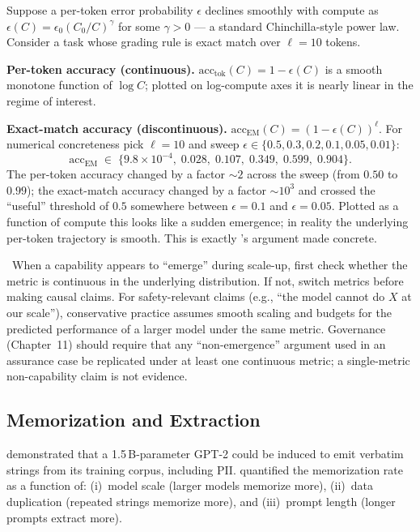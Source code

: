 \begin{workedexample}
Suppose a per-token error probability $\epsilon$ declines smoothly
with compute as $\epsilon(C) = \epsilon_0 (C_0/C)^{\gamma}$ for some
$\gamma > 0$ — a standard Chinchilla-style power law. Consider a
task whose grading rule is exact match over $\ell = 10$ tokens.

\textbf{Per-token accuracy (continuous).}
$\mathrm{acc}_{\mathrm{tok}}(C) = 1 - \epsilon(C)$ is a smooth
monotone function of $\log C$; plotted on log-compute axes it is
nearly linear in the regime of interest.

\textbf{Exact-match accuracy (discontinuous).}
$\mathrm{acc}_{\mathrm{EM}}(C) = (1 - \epsilon(C))^{\ell}$. For
numerical concreteness pick $\ell = 10$ and sweep
$\epsilon \in \{0.5, 0.3, 0.2, 0.1, 0.05, 0.01\}$:
\[
\mathrm{acc}_{\mathrm{EM}} \;\in\;
\{9.8\!\times\!10^{-4},\; 0.028,\; 0.107,\; 0.349,\; 0.599,\; 0.904\}.
\]
The per-token accuracy changed by a factor $\sim 2$ across the sweep
(from $0.50$ to $0.99$); the exact-match accuracy changed by a factor
$\sim 10^{3}$ and crossed the ``useful'' threshold of $0.5$ somewhere
between $\epsilon = 0.1$ and $\epsilon = 0.05$. Plotted as a function
of compute this looks like a sudden emergence; in reality the
underlying per-token trajectory is smooth. This is exactly
\citet{schaeffer2023mirage}'s argument made concrete.
\end{workedexample}

\Cons\ When a capability appears to ``emerge'' during scale-up,
first check whether the metric is continuous in the underlying
distribution. If not, switch metrics before making causal claims.
For safety-relevant claims (e.g., ``the model cannot do $X$ at our
scale''), conservative practice assumes smooth scaling and budgets
for the predicted performance of a larger model under the same
metric. Governance (Chapter~11) should require that any
``non-emergence'' argument used in an assurance case be replicated
under at least one continuous metric; a single-metric
non-capability claim is not evidence.

\subsection{Memorization and Extraction}

\citet{carlini2021extracting} demonstrated that a 1.5\,B-parameter
GPT-2 could be induced to emit verbatim strings from its training
corpus, including PII. \citet{carlini2023quantifying} quantified the
memorization rate as a function of:
(i)~model scale (larger models memorize more),
(ii)~data duplication (repeated strings memorize more), and
(iii)~prompt length (longer prompts extract more).

